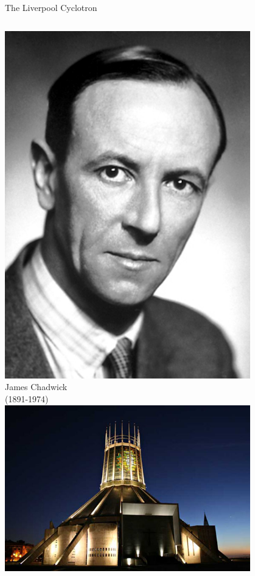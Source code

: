 %
%
%

\begin{frame}{The Liverpool Cyclotron}

\begin{columns}
  \begin{column}{0.25\textwidth}
     \begin{center}
       \includegraphics[width=0.80\textwidth]{./images/people/chadwick.jpg}\\
       {\scriptsize  James Chadwick\\ (1891-1974)}\\
       \vspace{0.2cm}
       \includegraphics[width=0.80\textwidth]{./images/photos/met_cathedral.jpg}\\

\end{center}
\end{column}
\end{columns}
\end{frame}
